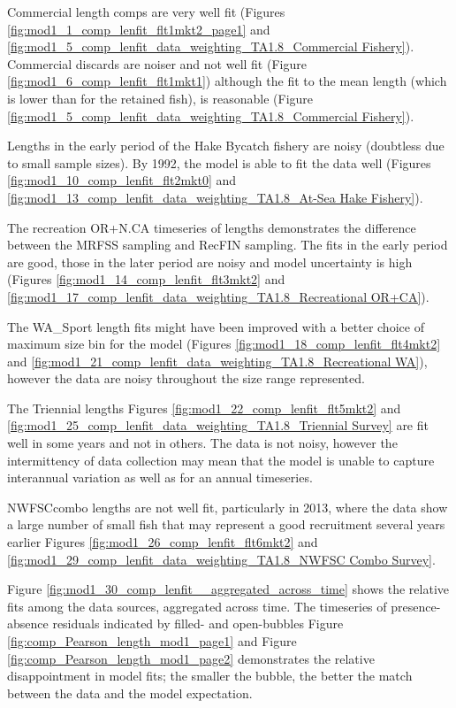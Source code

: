 \documentclass[12pt,]{article}
\begin{document}
Commercial length comps are very well fit (Figures
\ref{fig:mod1_1_comp_lenfit_flt1mkt2_page1} and
\ref{fig:mod1_5_comp_lenfit_data_weighting_TA1.8_Commercial Fishery}).
Commercial discards are noiser and not well fit (Figure
\ref{fig:mod1_6_comp_lenfit_flt1mkt1}) although the fit to the mean
length (which is lower than for the retained fish), is reasonable
(Figure
\ref{fig:mod1_5_comp_lenfit_data_weighting_TA1.8_Commercial Fishery}).

Lengths in the early period of the Hake Bycatch fishery are noisy
(doubtless due to small sample sizes). By 1992, the model is able to fit
the data well (Figures \ref{fig:mod1_10_comp_lenfit_flt2mkt0} and
\ref{fig:mod1_13_comp_lenfit_data_weighting_TA1.8_At-Sea Hake Fishery}).

The recreation OR+N.CA timeseries of lengths demonstrates the difference
between the MRFSS sampling and RecFIN sampling. The fits in the early
period are good, those in the later period are noisy and model
uncertainty is high (Figures \ref{fig:mod1_14_comp_lenfit_flt3mkt2} and
\ref{fig:mod1_17_comp_lenfit_data_weighting_TA1.8_Recreational OR+CA}).

The WA\_Sport length fits might have been improved with a better choice
of maximum size bin for the model (Figures
\ref{fig:mod1_18_comp_lenfit_flt4mkt2} and
\ref{fig:mod1_21_comp_lenfit_data_weighting_TA1.8_Recreational WA}),
however the data are noisy throughout the size range represented.

The Triennial lengths Figures \ref{fig:mod1_22_comp_lenfit_flt5mkt2} and
\ref{fig:mod1_25_comp_lenfit_data_weighting_TA1.8_Triennial Survey} are
fit well in some years and not in others. The data is not noisy, however
the intermittency of data collection may mean that the model is unable
to capture interannual variation as well as for an annual timeseries.

NWFSCcombo lengths are not well fit, particularly in 2013, where the
data show a large number of small fish that may represent a good
recruitment several years earlier Figures
\ref{fig:mod1_26_comp_lenfit_flt6mkt2} and
\ref{fig:mod1_29_comp_lenfit_data_weighting_TA1.8_NWFSC Combo Survey}.

Figure \ref{fig:mod1_30_comp_lenfit__aggregated_across_time} shows the
relative fits among the data sources, aggregated across time. The
timeseries of presence-absence residuals indicated by filled- and
open-bubbles Figure \ref{fig:comp_Pearson_length_mod1_page1} and Figure
\ref{fig:comp_Pearson_length_mod1_page2} demonstrates the relative
disappointment in model fits; the smaller the bubble, the better the
match between the data and the model expectation.
\end{document}
